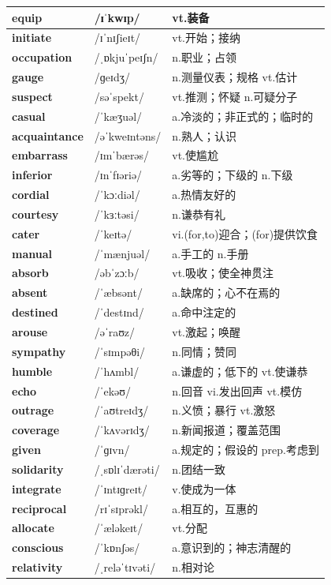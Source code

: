 \documentclass[14pt,a4paper]{extarticle}
\begin{document}
\begin{longtable}{ p{} p{} p{} }
\textbf{equip} & /ɪˈkwɪp/ & vt.装备 \\ \hline
\textbf{initiate} & /ɪˈnɪʃieɪt/ & vt.开始；接纳 \\ \hline
\textbf{occupation} & /ˌɒkjuˈpeɪʃn/ & n.职业；占领 \\ \hline
\textbf{gauge} & /ɡeɪdʒ/ & n.测量仪表；规格 \quad vt.估计 \\ \hline
\textbf{suspect} & /səˈspekt/ & vt.推测；怀疑 \quad n.可疑分子 \\ \hline
\textbf{casual} & /ˈkæʒuəl/ & a.冷淡的；非正式的；临时的 \\ \hline
\textbf{acquaintance} & /əˈkweɪntəns/ & n.熟人；认识 \\ \hline
\textbf{embarrass} & /ɪmˈbærəs/ & vt.使尴尬 \\ \hline
\textbf{inferior} & /ɪnˈfɪəriə/ & a.劣等的；下级的 \quad n.下级 \\ \hline
\textbf{cordial} & /ˈkɔːdiəl/ & a.热情友好的 \\ \hline
\textbf{courtesy} & /ˈkɜːtəsi/ & n.谦恭有礼 \\ \hline
\textbf{cater} & /ˈkeɪtə/ & vi.(for,to)迎合；(for)提供饮食 \\ \hline
\textbf{manual} & /ˈmænjuəl/ & a.手工的 \quad n.手册 \\ \hline
\textbf{absorb} & /əbˈzɔːb/ & vt.吸收；使全神贯注 \\ \hline
\textbf{absent} & /ˈæbsənt/ & a.缺席的；心不在焉的 \\ \hline
\textbf{destined} & /ˈdestɪnd/ & a.命中注定的 \\ \hline
\textbf{arouse} & /əˈraʊz/ & vt.激起；唤醒 \\ \hline
\textbf{sympathy} & /ˈsɪmpəθi/ & n.同情；赞同 \\ \hline
\textbf{humble} & /ˈhʌmbl/ & a.谦虚的；低下的 \quad vt.使谦恭 \\ \hline
\textbf{echo} & /ˈekəʊ/ & n.回音 \quad vi.发出回声 \quad vt.模仿 \\ \hline
\textbf{outrage} & /ˈaʊtreɪdʒ/ & n.义愤；暴行 \quad vt.激怒 \\ \hline
\textbf{coverage} & /ˈkʌvərɪdʒ/ & n.新闻报道；覆盖范围 \\ \hline
\textbf{given} & /ˈɡɪvn/ & a.规定的；假设的 \quad prep.考虑到 \\ \hline
\textbf{solidarity} & /ˌsɒlɪˈdærəti/ & n.团结一致 \\ \hline
\textbf{integrate} & /ˈɪntɪɡreɪt/ & v.使成为一体 \\ \hline
\textbf{reciprocal} & /rɪˈsɪprəkl/ & a.相互的，互惠的 \\ \hline
\textbf{allocate} & /ˈæləkeɪt/ & vt.分配 \\ \hline
\textbf{conscious} & /ˈkɒnʃəs/ & a.意识到的；神志清醒的 \\ \hline
\textbf{relativity} & /ˌreləˈtɪvəti/ & n.相对论 \\ \hline
\end{longtable}
\end{document}
